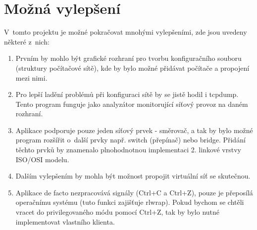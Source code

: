 \chapter{Možná vylepšení}

V~tomto projektu je možné pokračovat mnohými vylepšeními, zde jsou uvedeny některé z~nich:

\begin{enumerate}
\item Prvním by mohlo být grafické rozhraní pro tvorbu konfiguračního souboru (struktury počítačové sítě), kde by bylo možné přidávat počítače a propojení mezi nimi.                                                                                                                                                                     

\item Pro lepší ladění problémů při konfiguraci sítě by se jistě hodil i tcpdump. Tento program funguje jako analyzátor monitorující síťový provoz na daném rozhraní.

\item Aplikace podporuje pouze jeden síťový prvek - směrovač, a tak by bylo možné program rozšířit o~další prvky např. switch (přepínač) nebo bridge. Přidání těchto prvků by znamenalo plnohodnotnou implementaci 2. linkové vrstvy ISO/OSI modelu.

\item Dalším vylepšením by mohla být možnost propojit virtuální síť se skutečnou. 

\item Aplikace de facto nezpracovává signály (Ctrl+C a Ctrl+Z), pouze je přeposílá operačnímu systému (tuto funkci zajišťuje rlwrap). Pokud bychom se chtěli vracet do privilegovaného módu pomocí Ctrl+Z, tak by bylo nutné implementovat vlastního klienta.
\end{enumerate}









